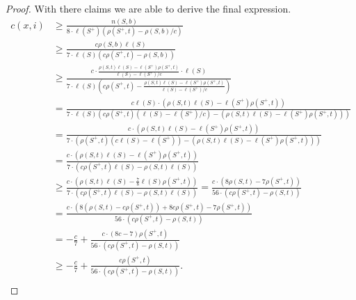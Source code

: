 \documentclass[11pt]{article} %
\newcommand{\density}[2]{\rho(#1, #2)}
\newcommand{\length}[1]{\ell(#1)}
\newcommand{\charge}[2]{c(#1, #2)}
\newcommand{\scount}[2]{n(#1, #2)}
\begin{document}
\begin{proof}
With there claims we are able to derive the final expression.
\[
\begin{split}
\charge{x}{i} 
	& \geq \frac{\scount{S}{b}}{8 \cdot \length{S^+}(\density{S^+}{t} - \density{S}{b}/c)} \\
	& \geq \frac{c\density{S}{b}\length{S}}{7 \cdot \length{S}(c\density{S^+}{t} - \density{S}{b})} \\
	& \geq \frac{c \cdot \frac{\density{S}{t}\length{S} - \length{S^+}\density{S^+}{t}}{\length{S} - \length{S^+}/c} \cdot \length{S}}{7 \cdot \length{S}\left(c\density{S^+}{t} - \frac{\density{S}{t}\length{S} - \length{S^+}\density{S^+}{t}}{\length{S} - \length{S^+}/c}\right)} \\
	& = \frac{c \length{S} \cdot (\density{S}{t}\length{S} - \length{S^+}\density{S^+}{t})}{7 \cdot \length{S}\left(c\density{S^+}{t}(\length{S} - \length{S^+}/c) - (\density{S}{t}\length{S} - \length{S^+}\density{S^+}{t})\right)} \\
	& = \frac{c \cdot (\density{S}{t}\length{S} - \length{S^+}\density{S^+}{t})}{7 \cdot \left(\density{S^+}{t}(c\length{S} - \length{S^+}) - (\density{S}{t}\length{S} - \length{S^+}\density{S^+}{t})\right)} \\
	& = \frac{c \cdot (\density{S}{t}\length{S} - \length{S^+}\density{S^+}{t})}{7 \cdot \left(c\density{S^+}{t}\length{S} - \density{S}{t}\length{S}\right)} \\
	& \geq \frac{c \cdot (\density{S}{t}\length{S} - \frac{7}{8}\length{S}\density{S^+}{t})}{7 \cdot \left(c\density{S^+}{t}\length{S} - \density{S}{t}\length{S}\right)} = \frac{c \cdot (8\density{S}{t} - 7\density{S^+}{t})}{56 \cdot \left(c\density{S^+}{t} - \density{S}{t}\right)} \\
	& = \frac{c \cdot (8(\density{S}{t} - c\density{S^+}{t}) + 8c\density{S^+}{t} - 7\density{S^+}{t})}{56 \cdot \left(c\density{S^+}{t} - \density{S}{t}\right)} \\
	& = -\frac{c}{7} + \frac{c \cdot (8c - 7)\density{S^+}{t}}{56 \cdot \left(c\density{S^+}{t} - \density{S}{t}\right)} \\
	& \geq -\frac{c}{7} + \frac{c \density{S^+}{t}}{56 \cdot \left(c\density{S^+}{t} - \density{S}{t}\right)}. \\
\end{split}
\]
\end{proof}
\end{document}
